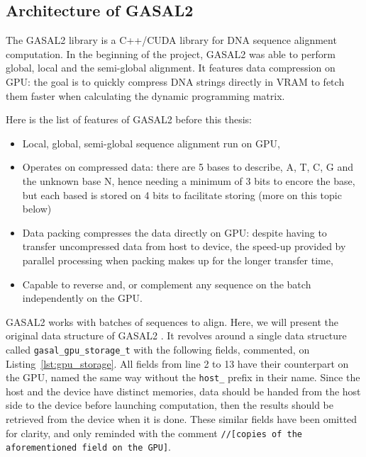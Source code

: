 \subsection{Architecture of GASAL2}
The GASAL2 library is a C++/CUDA library for DNA sequence alignment computation. In the beginning of the project, GASAL2 was able to perform global, local and the semi-global alignment. It features data compression on GPU: the goal is to quickly compress DNA strings directly in VRAM to fetch them faster when calculating the dynamic programming matrix.

Here is the list of features of GASAL2 before this thesis:
\begin{itemize}
	\item Local, global, semi-global sequence alignment run on GPU,
	\item Operates on compressed data: there are 5 bases to describe, A, T, C, G and the unknown base N, hence needing a minimum of 3 bits to encore the base, but each based is stored on 4 bits to facilitate storing (more on this topic below)
	\item Data packing compresses the data directly on GPU: despite having to transfer uncompressed data from host to device, the speed-up provided by parallel processing when packing makes up for the longer transfer time,
	\item Capable to reverse and, or complement any sequence on the batch independently on the GPU.
\end{itemize}

GASAL2 works with batches of sequences to align. Here, we will present the original data structure of GASAL2 . It revolves around a single data structure called \verb|gasal_gpu_storage_t| with the following fields, commented, on Listing~\ref{lst:gpu_storage}. All fields from line 2 to 13 have their counterpart on the GPU, named the same way without the \verb|host_| prefix in their name. Since the host and the device have distinct memories, data should be handed from the host side to the device before launching computation, then the results should be retrieved from the device when it is done.  
These similar fields have been omitted for clarity, and only reminded with the comment \verb|//[copies of the aforementioned field on the GPU]|.

